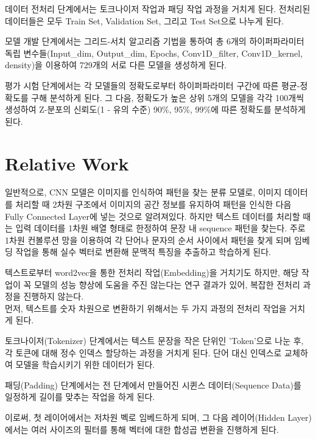 \documentclass{jcse}
\begin{document}
데이터 전처리 단계에서는 토크나이저 작업과 패딩 작업 과정을 거치게 된다. 전처리된 데이터들은 모두 Train Set, Validation Set, 그리고 Test Set으로 나누게 된다. 

모델 개발 단계에서는 그리드-서치 알고리즘 기법을 통하여 총 6개의 하이퍼파라미터 독립 변수들(Input\_dim, Output\_dim, Epochs, Conv1D\_filter, Conv1D\_kernel, density)을 이용하여 729개의 서로 다른 모델을 생성하게 된다. 

평가 시험 단계에서는 각 모델들의 정확도로부터 하이퍼파라미터 구간에 따른 평균-정확도를 구해 분석하게 된다. 그 다음, 정확도가 높은 상위 5개의 모델을 각각 100개씩 생성하여 Z-분포의 신뢰도(1 - 유의 수준) 90\%, 95\%, 99\%에 따른 정확도를 분석하게 된다.

\section{Relative Work} \label{s:ex}

일반적으로, CNN 모델은 이미지를 인식하여 패턴을 찾는 분류 모델\cite{cite:TextRecognition1}로, 이미지 데이터를 처리할 때 2차원 구조에서 이미지의 공간 정보\cite{cite:cui2024deep}를 유지하여 패턴을 인식한 다음 Fully Connected Layer에 넣는 것으로 알려져있다. 하지만 텍스트 데이터를 처리할 때는 입력 데이터를 1차원 배열 형태로 한정하여 문장 내 sequence 패턴\cite{cite:textClassification1}을 찾는다. 주로 1차원 컨볼루션 망을 이용하여 각 단어나 문자의 순서 사이에서 패턴을 찾게 되며 임베딩 작업을 통해 실수 벡터로 변환해 문맥적 특징을 추출하고 학습하게 된다.

텍스트로부터 word2vec을 통한 전처리 작업(Embedding)\cite{cite:zhang2024teleclass}을 거치기도 하지만, 해당 작업이 꼭 모델의 성능 향상에 도움을 주진 않는다는 연구 결과\cite{cite:word2vec}가 있어, 복잡한 전처리 과정을 진행하지 않는다.\cite{cite:jiang2024quick}
\\
먼저, 텍스트를 숫자 차원으로 변환하기 위해서는 두 가지 과정의 전처리 작업을 거치게 된다.

토크나이저(Tokenizer) 단계에서는 텍스트 문장을 작은 단위인 'Token'\cite{cite:OnlineTokenizer}으로 나눈 후, 각 토큰에 대해 정수 인덱스 할당하는 과정\cite{cite:TokenizerforCNN}을 거치게 된다. 단어 대신 인덱스로 교체하여 모델을 학습시키기 위한 데이터가 된다.

패딩(Padding) 단계에서는 전 단계에서 만들어진 시퀸스 데이터(Sequence Data)를 일정하게 길이를 맞추는 작업\cite{cite:Lopez-delRio2020EffectOfSequencePadding}을 하게 된다.

이로써, 첫 레이어에서는 저차원 벡로 임베드\cite{cite:Reddy2020EffectOfPadding}하게 되며, 그 다음 레이어(Hidden Layer)에서는 여러 사이즈의 필터를 통해 벡터에 대한 합성곱 변환\cite{cite:IntroductionforCNN}을 진행하게 된다.
\end{document}
